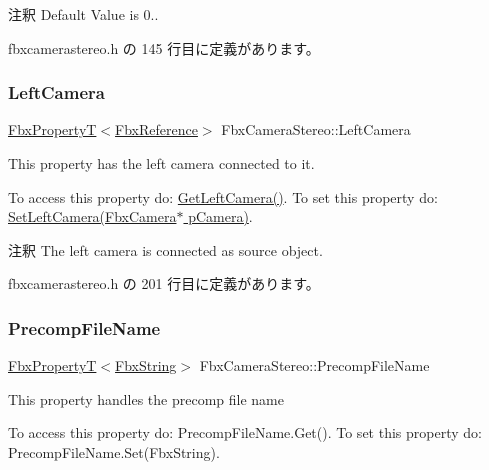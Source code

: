 \begin{DoxyRemark}{注釈}
Default Value is 0.. 
\end{DoxyRemark}


 fbxcamerastereo.\+h の 145 行目に定義があります。

\mbox{\label{class_fbx_camera_stereo_a92cc37f2c93f8920e66756ef4d947762}} 
\subsubsection{\texorpdfstring{Left\+Camera}{LeftCamera}}
{\footnotesize\ttfamily \hyperlink{class_fbx_property_t}{Fbx\+PropertyT}$<$\hyperlink{fbxtypes_8h_a44df6a2eec915cf27cd481e5c5e48a24}{Fbx\+Reference}$>$ Fbx\+Camera\+Stereo\+::\+Left\+Camera}

This property has the left camera connected to it.

To access this property do\+: \hyperlink{class_fbx_camera_stereo_a6841f71c09bdd63c7e936cdb23e818e9}{Get\+Left\+Camera()}. To set this property do\+: \hyperlink{class_fbx_camera_stereo_a3f6d9d09dd4ec6f9fe1b1b829f26a11f}{Set\+Left\+Camera(\+Fbx\+Camera$\ast$ p\+Camera)}.

\begin{DoxyRemark}{注釈}
The left camera is connected as source object. 
\end{DoxyRemark}


 fbxcamerastereo.\+h の 201 行目に定義があります。

\mbox{\label{class_fbx_camera_stereo_a25294714b9dfedce9180102396ebd7bc}} 
\subsubsection{\texorpdfstring{Precomp\+File\+Name}{PrecompFileName}}
{\footnotesize\ttfamily \hyperlink{class_fbx_property_t}{Fbx\+PropertyT}$<$\hyperlink{class_fbx_string}{Fbx\+String}$>$ Fbx\+Camera\+Stereo\+::\+Precomp\+File\+Name}

This property handles the precomp file name

To access this property do\+: Precomp\+File\+Name.\+Get(). To set this property do\+: Precomp\+File\+Name.\+Set(\+Fbx\+String).


